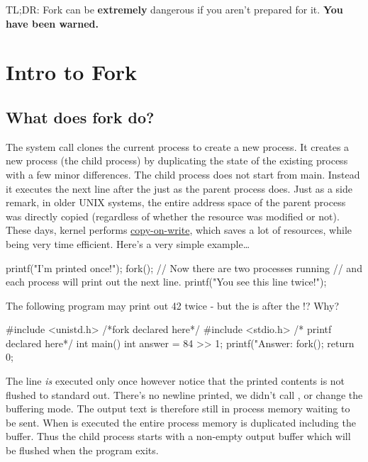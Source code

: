 TL;DR: Fork can be \textbf{extremely} dangerous if you aren't prepared for it. \textbf{You have been warned.}

\section{Intro to Fork}\label{intro-to-fork}

\subsection{What does fork do?}\label{what-does-fork-do}

The  system call clones the current process to create a new process. It creates a new process (the child process) by duplicating the state of the existing process with a few minor differences. The child process does not start from main. Instead it executes the next line after the  just as the parent process does. Just as a side remark, in older UNIX systems, the entire address space of the parent process was directly copied (regardless of whether the resource was modified or not). These days, kernel performs \href{https://en.wikipedia.org/wiki/Copy-on-write}{copy-on-write}, which saves a lot of resources, while being very time efficient. Here's a very simple example\ldots{}

\begin{code}[language=C]
printf("I'm printed once!\n");
fork();
// Now there are two processes running
// and each process will print out the next line.
printf("You see this line twice!\n");
\end{code}

The following program may print out 42 twice - but the  is after the !? Why?

\begin{code}[language=C]
#include <unistd.h> /*fork declared here*/
#include <stdio.h> /* printf declared here*/
int main() {
   int answer = 84 >> 1;
   printf("Answer: %
   fork();
   return 0;
}
\end{code}

The  line \emph{is} executed only once however notice that the printed contents is not flushed to standard out. There's no newline printed, we didn't call , or change the buffering mode. The output text is therefore still in process memory waiting to be sent. When  is executed the entire process memory is duplicated including the buffer. Thus the child process starts with a non-empty output buffer which will be flushed when the program exits.

